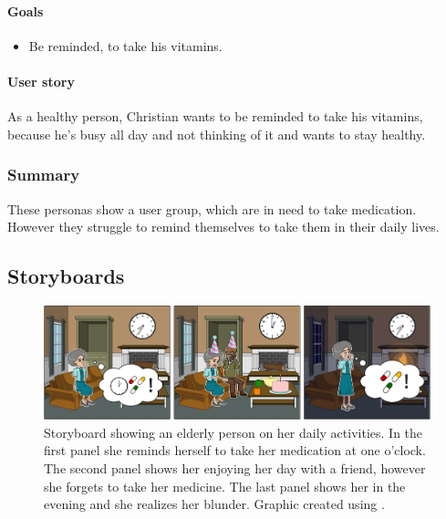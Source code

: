 \documentclass[conference]{IEEEtran}
\begin{document}
\paragraph*{Goals}
\begin{itemize}[leftmargin=1.25cm]
	\item Be reminded, to take his vitamins.

\end{itemize}

\paragraph*{User story}
As a healthy person, Christian wants to be reminded to take his vitamins, because he's busy all day and not thinking of it and wants to stay healthy.

\subsubsection{Summary}
These personas show a user group, which are in need to take medication. However they struggle to 
remind themselves to take them in their daily lives.

\subsection{Storyboards}
\begin{figure}
	\includegraphics[width=\linewidth]{images/storyboard01.png}
	\caption
	{Storyboard showing an elderly person on her daily activities.
		In the first panel she reminds herself to take her medication at one o'clock.
		The second panel shows her enjoying her day with a friend, however she forgets to take her medicine.
		The last panel shows her in the evening and she realizes her blunder.
		Graphic created using \cite{storyboard}.}
	\label{fig:storyboard1}
\end{figure}
\end{document}
